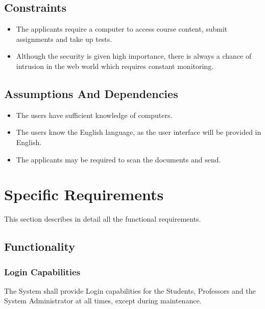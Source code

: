 \documentclass[12pt, a4]{article}
\begin{document}

\subsection{Constraints}
\begin{itemize}
    \item The applicants require a computer to access course content, submit assignments and take up tests.
    \item Although the security is given high importance, there is always a chance of intrusion in the web world which requires constant monitoring.
\end{itemize}


\subsection{Assumptions And Dependencies}
\begin{itemize}
    \item The users have sufficient knowledge of computers.
    \item The users know the English language, as the user interface will be provided in English.
    \item The applicants may be required to scan the documents and send.
\end{itemize}


\section{Specific Requirements}
This section describes in detail all the functional requirements.


\subsection{Functionality}

\subsubsection{Login Capabilities}
The System shall provide Login capabilities for the Students, Professors and the System Administrator at all times, except during maintenance.
\end{document}
